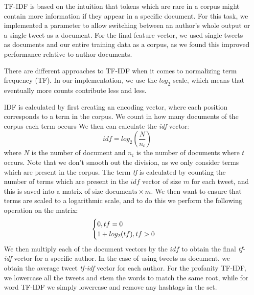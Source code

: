         TF-IDF is based on the intuition that tokens which are rare in a corpus might contain more information if they appear in a specific document. For this task, we implemented a parameter to allow switching between an author's whole output or a single tweet as a document. For the final feature vector, we used single tweets as documents and our entire training data as a corpus, as we found this improved performance relative to author documents.
        
        There are different approaches to TF-IDF when it comes to normalizing term frequency (TF). In our implementation, we use the $log_2$ scale, which means that eventually more counts contribute less and less.
        
        IDF is calculated by first creating an encoding vector, where each position corresponds to a term in the corpus. We  count in how many documents of the corpus each term occurs We then can calculate the \emph{idf} vector: $$idf=log_2(\frac{N}{n_t})$$ where $N$ is the number of document and $n_t$ is the number of documents where $t$ occurs. Note that we don't smooth out the  division, as we only consider terms which are present in the corpus. The term \emph{tf} is calculated by counting the number of terms which are present in the $idf$ vector of size $m$ for each tweet, and this is saved into a matrix of size $\text{documents} \times m$. We then want to ensure that terms are scaled to a logarithmic scale, and to do this we perform the following operation on the matrix:
        \begin{equation*}
            \begin{cases}
              0, \emph{}{tf}=0\\
              1+log_2(\emph{}{tf}), \emph{}{tf}>0\\
            \end{cases}
        \end{equation*}
        We then multiply each of the document vectors by the $idf$ to obtain the final \emph{tf-idf} vector for a specific author. In the case of using tweets as document, we obtain the average tweet \emph{tf-idf} vector for each author. For the profanity TF-IDF, we lowercase all the tweets and stem the words to match the same root, while for word TF-IDF we simply lowercase and remove any hashtags in the set.
        
